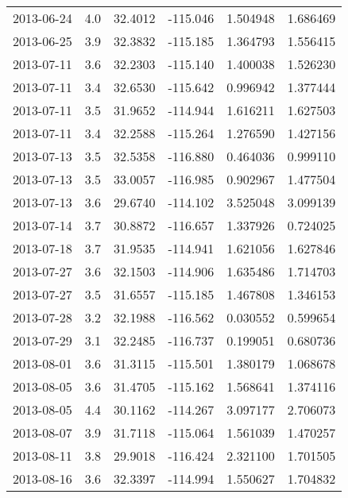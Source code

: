 \begin{tabular}{lrrrrr}
2013-06-24 &       4.0 &  32.4012 &  -115.046 &         1.504948 &         1.686469 \\
2013-06-25 &       3.9 &  32.3832 &  -115.185 &         1.364793 &         1.556415 \\
2013-07-11 &       3.6 &  32.2303 &  -115.140 &         1.400038 &         1.526230 \\
2013-07-11 &       3.4 &  32.6530 &  -115.642 &         0.996942 &         1.377444 \\
2013-07-11 &       3.5 &  31.9652 &  -114.944 &         1.616211 &         1.627503 \\
2013-07-11 &       3.4 &  32.2588 &  -115.264 &         1.276590 &         1.427156 \\
2013-07-13 &       3.5 &  32.5358 &  -116.880 &         0.464036 &         0.999110 \\
2013-07-13 &       3.5 &  33.0057 &  -116.985 &         0.902967 &         1.477504 \\
2013-07-13 &       3.6 &  29.6740 &  -114.102 &         3.525048 &         3.099139 \\
2013-07-14 &       3.7 &  30.8872 &  -116.657 &         1.337926 &         0.724025 \\
2013-07-18 &       3.7 &  31.9535 &  -114.941 &         1.621056 &         1.627846 \\
2013-07-27 &       3.6 &  32.1503 &  -114.906 &         1.635486 &         1.714703 \\
2013-07-27 &       3.5 &  31.6557 &  -115.185 &         1.467808 &         1.346153 \\
2013-07-28 &       3.2 &  32.1988 &  -116.562 &         0.030552 &         0.599654 \\
2013-07-29 &       3.1 &  32.2485 &  -116.737 &         0.199051 &         0.680736 \\
2013-08-01 &       3.6 &  31.3115 &  -115.501 &         1.380179 &         1.068678 \\
2013-08-05 &       3.6 &  31.4705 &  -115.162 &         1.568641 &         1.374116 \\
2013-08-05 &       4.4 &  30.1162 &  -114.267 &         3.097177 &         2.706073 \\
2013-08-07 &       3.9 &  31.7118 &  -115.064 &         1.561039 &         1.470257 \\
2013-08-11 &       3.8 &  29.9018 &  -116.424 &         2.321100 &         1.701505 \\
2013-08-16 &       3.6 &  32.3397 &  -114.994 &         1.550627 &         1.704832 \\

\end{tabular}
